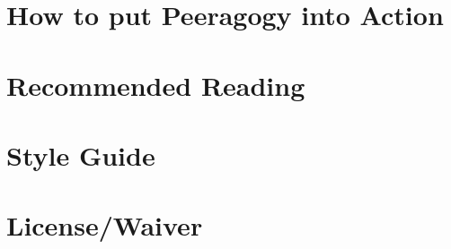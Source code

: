 \documentclass[ebook, 12pt, twoside]{memoir}
\let\sc\scshape
\let\sc\scshape
\begin{document}
\chapter[\textbf{How to put Peeragogy into Action}]{How to put Peeragogy into Action}
%

%
\chapter[\textbf{Recommended Reading}]{Recommended Reading}
%

%
\chapter[\textbf{Style Guide}]{Style Guide}
%

%
%
%



\newpage
\chapter[\textbf{License/Waiver}]{License/Waiver}

%
\pagestyle{empty} \thispagestyle{empty}
\clearpage\mbox{}\clearpage\mbox{}\clearpage\mbox{}\clearpage    %
\end{document}
